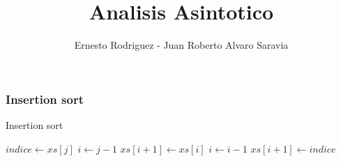 \documentclass{beamer}
\title[Asintotico]{Analisis Asintotico}
\author{Ernesto Rodriguez - Juan Roberto Alvaro Saravia}
\institute{
    Universidad Francisco Marroquin \\
    \medskip \textit{ernestorodriguez@ufm.edu - juanalvarado@ufm.edu}
}
\date[\today]{}
\begin{document}
\begin{frame}
\titlepage
\end{frame}

\begin{frame}

    \frametitle{Insertion sort}

    \begin{algorithm}[H]
        \caption{Insertion sort}
        \begin{algorithmic}[1]
        \State $indice\gets xs[j]$
        \State $i\gets j-1$
        \State $xs[i+1]\gets xs[i]$
        \State $i\gets i-1$
        \EndWhile
        \State $xs[i+1]\gets indice$
        \EndFor
        \EndProcedure
        \end{algorithmic}
    \end{algorithm}
    
\end{frame}
\end{document}
